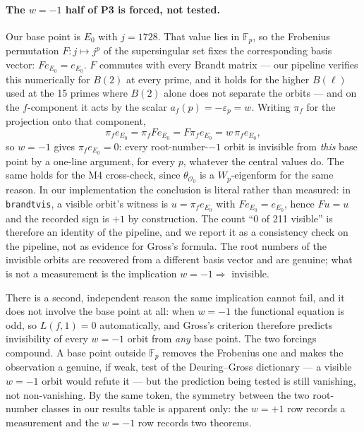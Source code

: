 \documentclass[11pt,a4paper]{article}
\theoremstyle{definition}
\newcommand{\Oz}{\mathcal{O}_0}
\begin{document}
\paragraph{The $w=-1$ half of P3 is forced, not tested.}\label{sec:w-forced}
Our base point is $E_0$ with $j=1728$. That value lies in $\mathbb F_p$, so the Frobenius permutation $F:j\mapsto j^p$ of the supersingular set fixes the corresponding basis vector: $Fe_{E_0}=e_{E_0}$. $F$ commutes with every Brandt matrix --- our pipeline verifies this numerically for $B(2)$ at every prime, and it holds for the higher $B(\ell)$ used at the 15 primes where $B(2)$ alone does not separate the orbits --- and on the $f$-component it acts by the scalar $a_f(p)=-\varepsilon_p=w$. Writing $\pi_f$ for the projection onto that component,
\[
  \pi_f e_{E_0}=\pi_f F e_{E_0}=F\pi_f e_{E_0}=w\,\pi_f e_{E_0},
\]
so $w=-1$ gives $\pi_f e_{E_0}=0$: every root-number-$-1$ orbit is invisible from \emph{this} base point by a one-line argument, for every $p$, whatever the central values do. The same holds for the M4 cross-check, since $\theta_{\Oz}$ is a $W_p$-eigenform for the same reason. In our implementation the conclusion is literal rather than measured: in \texttt{brandtvis}, a visible orbit's witness is $u=\pi_f e_{E_0}$ with $Fe_{E_0}=e_{E_0}$, hence $Fu=u$ and the recorded sign is $+1$ by construction. The count ``0 of 211 visible'' is therefore an identity of the pipeline, and we report it as a consistency check on the pipeline, not as evidence for Gross's formula. The root numbers of the invisible orbits are recovered from a different basis vector and are genuine; what is not a measurement is the implication $w=-1\Rightarrow$ invisible.

There is a second, independent reason the same implication cannot fail, and it does not involve the base point at all: when $w=-1$ the functional equation is odd, so $L(f,1)=0$ automatically, and Gross's criterion therefore predicts invisibility of every $w=-1$ orbit from \emph{any} base point. The two forcings compound. A base point outside $\mathbb F_p$ removes the Frobenius one and makes the observation a genuine, if weak, test of the Deuring--Gross dictionary --- a visible $w=-1$ orbit would refute it --- but the prediction being tested is still vanishing, not non-vanishing. By the same token, the symmetry between the two root-number classes in our results table is apparent only: the $w=+1$ row records a measurement and the $w=-1$ row records two theorems.
\end{document}

